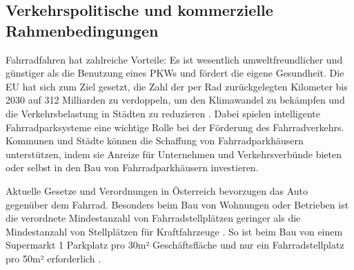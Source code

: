\subsection{Verkehrspolitische und kommerzielle Rahmenbedingungen}

Fahrradfahren hat zahlreiche Vorteile: Es ist wesentlich umweltfreundlicher und günstiger als die Benutzung eines PKWs und fördert die eigene Gesundheit. Die EU hat sich zum Ziel gesetzt, die Zahl der per Rad zurückgelegten Kilometer bis 2030 auf 312 Milliarden zu verdoppeln, um den Klimawandel zu bekämpfen und die Verkehrsbelastung in Städten zu reduzieren . Dabei spielen intelligente Fahrradparksysteme eine wichtige Rolle bei der Förderung des Fahrradverkehrs. Kommunen und Städte können die Schaffung von Fahrradparkhäusern unterstützen, indem sie Anreize für Unternehmen und Verkehrsverbünde bieten oder selbst in den Bau von Fahrradparkhäusern investieren.

\noindent Aktuelle Gesetze und Verordnungen in Österreich bevorzugen das Auto gegenüber dem Fahrrad. Besonders beim Bau von Wohnungen oder Betrieben ist die verordnete Mindestanzahl von Fahrradstellplätzen geringer als die Mindestanzahl von Stellplätzen für Kraftfahrzeuge . So ist beim Bau von einem Supermarkt 1 Parkplatz pro 30m² Geschäftsfläche und nur ein Fahrradstellplatz pro 50m² erforderlich .
